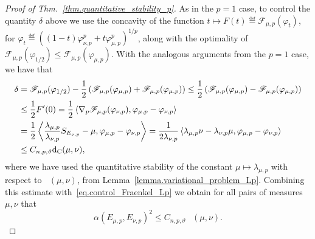 \documentclass[a4paper, 10pt, twoside]{amsart}
\numberwithin{equation}{section}
\theoremstyle{plain}
\theoremstyle{definition}
\DeclareMathOperator{\dc}{\mathrm{d}_\mathrm{C}}
\begin{document}
\begin{proof}[Proof of Thm.~\ref{thm.quantitative_stability_p}]
    As in the $p = 1$ case, to control the quantity $\delta$ above we use the concavity of the function $t \mapsto F(t) \eqdef \mathscr{F}_{\mu,p}(\varphi_{t})$, for $\varphi_t \eqdef {\left( (1-t)\varphi_{\nu,p}^p + t\varphi_{\mu,p}^p \right)}^{1/p}$, along with the optimality of $\mathscr{F}_{\mu,p}(\varphi_{1/2}) \le \mathscr{F}_{\mu,p}(\varphi_{\mu,p})$. With the analogous arguments from the $p=1$ case, we have that 
    \begin{align*}
        \delta 
        &= 
        \mathscr{F}_{\mu,p}(\varphi_{1/2}) 
        - 
        \frac{1}{2}
        \left(
            \mathscr{F}_{\mu,p}(\varphi_{\mu,p}) 
            + 
            \mathscr{F}_{\mu,p}(\varphi_{\mu,p}) 
        \right)
        \le \frac{1}{2}
        \left(
            \mathscr{F}_{\mu,p}(\varphi_{\mu,p}) 
            - 
            \mathscr{F}_{\mu,p}(\varphi_{\mu,p}) 
        \right)\\ 
        &\le 
        \frac{1}{2}F'(0) = 
        \frac{1}{2}
        \inner{\nabla_p \mathscr{F}_{\mu,p}(\varphi_{\nu,p}), \varphi_{\mu,p} - \varphi_{\nu,p}}\\
        &= 
        \frac{1}{2}
        \inner{
            \frac{\lambda_{\mu,p}}{\lambda_{\nu,p}}S_{E_{\nu,p}} - \mu, \varphi_{\mu,p} - \varphi_{\nu,p}}
        = \frac{1}{2\lambda_{\nu,p}}
        \inner{\lambda_{\mu,p} \nu - \lambda_{\nu,p} \mu, \varphi_{\mu,p} - \varphi_{\nu,p}}\\ 
        &\le  
        C_{n,p,\vartheta}{\dc(\mu,\nu)},
    \end{align*}
    where we have used the quantitative stability of the constant $\mu \mapsto \lambda_{\mu,p}$ with respect to $\dc(\mu,\nu)$, from Lemma~\ref{lemma.variational_problem_Lp}. Combining this estimate with~\eqref{eq.control_Fraenkel_Lp} we obtain for all pairs of measures $\mu,\nu$ that 
    \[
        \alpha(E_{\mu,p},E_{\nu,p})^2 \le C_{n,p,\vartheta}\, {\dc(\mu,\nu)}.
    \]


\end{proof}
\end{document}
